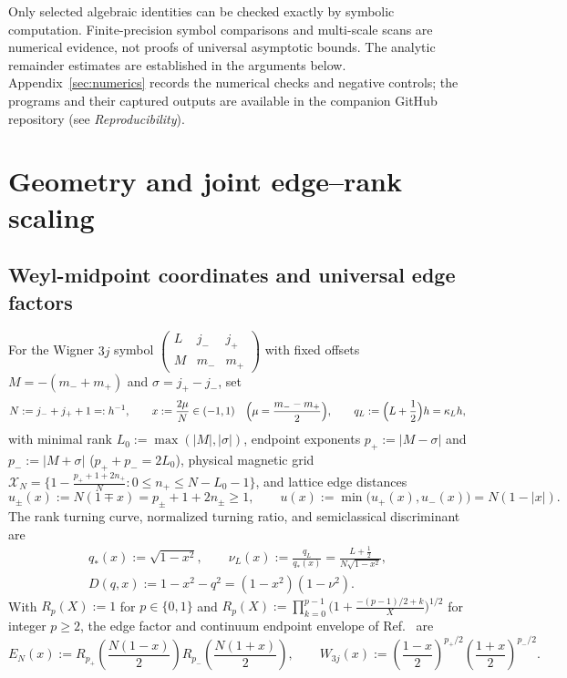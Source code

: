 \documentclass[11pt]{article}
\theoremstyle{definition}
\theoremstyle{remark}
\newcommand{\threej}[6]{\begin{pmatrix}#1&#2&#3\\#4&#5&#6\end{pmatrix}}
\newcommand{\cX}{\mathcal{X}}
\renewcommand{\_}{\oldunderscore\penalty0\hskip0pt\relax}
\begin{document}
Only selected algebraic identities can be checked exactly by symbolic computation. Finite-precision symbol comparisons and
  multi-scale scans are numerical evidence, not proofs of universal asymptotic bounds. The analytic remainder estimates are
  established in the arguments below. Appendix~\ref{sec:numerics} records the numerical checks and negative controls; the programs and their captured outputs
  are available in the companion GitHub repository (see \emph{Reproducibility}).

\section{Geometry and joint edge--rank scaling}
\label{sec:kinematics}

\subsection{Weyl-midpoint coordinates and universal edge factors}
For the Wigner $3j$ symbol $\threej{L}{j_-}{j_+}{M}{m_-}{m_+}$ with fixed offsets $M=-(m_-+m_+)$ and $\sigma=j_+-j_-$, set
\begin{equation}
  N := j_-+j_++1 =: h^{-1},\qquad x := \frac{2\mu}{N}\in(-1,1)\quad\Bigl(\mu=\frac{m_--m_+}{2}\Bigr),\qquad q_L := \Bigl(L+\frac12\Bigr)h = \kappa_L h,
  \label{eq:3j-coords}
\end{equation}
with minimal rank $L_0:=\max(|M|,|\sigma|)$, endpoint exponents $p_+:=|M-\sigma|$ and $p_-:=|M+\sigma|$ ($p_++p_-=2L_0$),
  physical magnetic grid $\cX_N=\{1-\frac{p_++1+2n_+}{N}:0\le n_+\le N-L_0-1\}$, and lattice edge distances
\begin{equation}
  u_\pm(x) := N(1\mp x) = p_\pm + 1 + 2n_\pm \ge 1,\qquad u(x) := \min\bigl(u_+(x),u_-(x)\bigr) = N(1-|x|).
  \label{eq:3j-u}
\end{equation}
The rank turning curve, normalized turning ratio, and semiclassical discriminant are
\begin{equation}
  \begin{gathered}
  q_*(x) := \sqrt{1-x^2},\qquad \nu_L(x) := \frac{q_L}{q_*(x)} = \frac{L+\tfrac12}{N\sqrt{1-x^2}},\\
  D(q,x) := 1-x^2-q^2 = (1-x^2)(1-\nu^2).
  \end{gathered}
  \label{eq:3j-turn}
\end{equation}
With $R_p(X):=1$ for $p\in\{0,1\}$ and $R_p(X):=\prod_{k=0}^{p-1}\bigl(1+\frac{-(p-1)/2+k}{X}\bigr)^{1/2}$ for integer $p\ge 2$,
  the edge factor and continuum endpoint envelope of Ref.~\cite{LewisFixedRank} are
\begin{equation}
  E_N(x) := R_{p_+}\!\left(\frac{N(1-x)}{2}\right) R_{p_-}\!\left(\frac{N(1+x)}{2}\right),\qquad
  W_{3j}(x) := \left(\frac{1-x}{2}\right)^{p_+/2}\left(\frac{1+x}{2}\right)^{p_-/2}.
  \label{eq:3j-edge-factor}
\end{equation}
\end{document}
